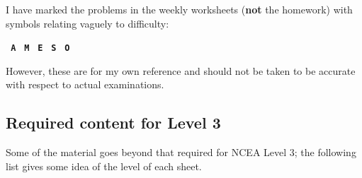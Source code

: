 I have marked the problems in the weekly worksheets (\textbf{not} the homework) with symbols relating vaguely to difficulty:

\begin{center}
\texttt{\textbf{\color{Cerulean} A}}
\texttt{\textbf{\color{PineGreen} M}}
\texttt{\textbf{\color{WildStrawberry} E}}
\texttt{\textbf{\color{Goldenrod} S}}
\texttt{\textbf{\color{BurntOrange} O}}
\end{center}

However, these are for my own reference and should not be taken to be accurate with respect to actual examinations.

\subsection*{Required content for Level 3}
Some of the material goes beyond that required for NCEA Level 3; the following list gives some idea of the level of each sheet.

